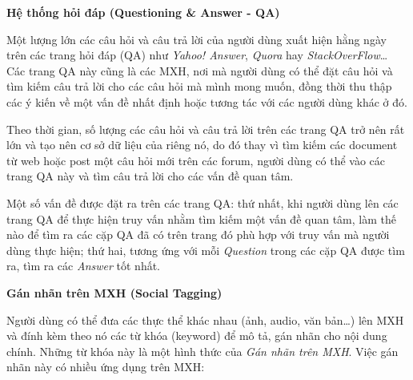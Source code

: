 \documentclass[12pt]{extarticle}
\begin{document}
			\par \textbf{Hệ thống hỏi đáp (Questioning \& Answer - QA)}
			\par Một lượng lớn các câu hỏi và câu trả lời của người dùng xuất hiện hằng ngày trên các trang hỏi đáp (QA) như \textit{Yahoo! Answer}, \textit{Quora} hay \textit{StackOverFlow}… Các trang QA này cũng là các MXH, nơi mà người dùng có thể đặt câu hỏi và tìm kiếm câu trả lời cho các câu hỏi mà mình mong muốn, đồng thời thu thập các ý kiến về một vấn đề nhất định hoặc tương tác với các người dùng khác ở đó. 
			\par Theo thời gian, số lượng các câu hỏi và câu trả lời trên các trang QA trở nên rất lớn và tạo nên cơ sở dữ liệu của riêng nó, do đó thay vì tìm kiếm các document từ web hoặc post một câu hỏi mới trên các forum, người dùng có thể vào các trang QA này và tìm câu trả lời cho các vấn đề quan tâm.
			\par Một số vấn đề được đặt ra trên các trang QA: thứ nhất, khi người dùng lên các trang QA để thực hiện truy vấn nhằm tìm kiếm một vấn đề quan tâm, làm thế nào để tìm ra các cặp QA đã có trên trang đó phù hợp với truy vấn mà người dùng thực hiện; thứ hai, tương ứng với mỗi \textit{Question} trong các cặp QA được tìm ra, tìm ra các \textit{Answer} tốt nhất.
			\par \textbf{Gán nhãn trên MXH (Social Tagging)}
			\par Người dùng có thể đưa các thực thể khác nhau (ảnh, audio, văn bản…) lên MXH và đính kèm theo nó các từ khóa (keyword) để mô tả, gán nhãn cho nội dung chính. Những từ khóa này là một hình thức của \textit{Gán nhãn trên MXH}. Việc gán nhãn này có nhiều ứng dụng trên MXH:
\end{document}
